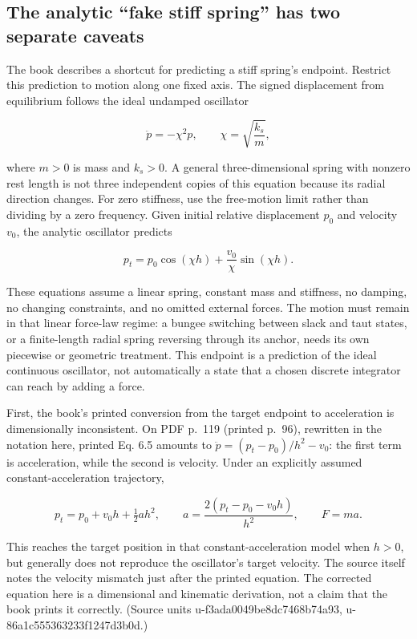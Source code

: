 \subsection{The analytic ``fake stiff spring'' has two separate caveats}\label{06-engine-ii-ch047-the-analytic-fake-stiff-spring-has-two-separate-caveats}

The book describes a shortcut for predicting a stiff spring's endpoint. Restrict this prediction to motion along one fixed axis. The signed displacement from equilibrium follows the ideal undamped oscillator

\[
\ddot p=-\chi^2p,\qquad \chi=\sqrt{\frac{k_s}{m}},
\]

where \(m>0\) is mass and \(k_s>0\). A general three-dimensional spring with nonzero rest length is not three independent copies of this equation because its radial direction changes. For zero stiffness, use the free-motion limit rather than dividing by a zero frequency. Given initial relative displacement \(p_0\) and velocity \(v_0\), the analytic oscillator predicts

\[
p_t=p_0\cos(\chi h)+\frac{v_0}{\chi}\sin(\chi h).
\]

These equations assume a linear spring, constant mass and stiffness, no damping, no changing constraints, and no omitted external forces. The motion must remain in that linear force-law regime: a bungee switching between slack and taut states, or a finite-length radial spring reversing through its anchor, needs its own piecewise or geometric treatment. This endpoint is a prediction of the ideal continuous oscillator, not automatically a state that a chosen discrete integrator can reach by adding a force.

First, the book's printed conversion from the target endpoint to acceleration is dimensionally inconsistent. On PDF p.~119 (printed p.~96), rewritten in the notation here, printed Eq. 6.5 amounts to \(\ddot p=(p_t-p_0)/h^2-v_0\): the first term is acceleration, while the second is velocity. Under an explicitly assumed constant-acceleration trajectory,

\[
p_t=p_0+v_0h+\tfrac12 ah^2,
\qquad
a=\frac{2(p_t-p_0-v_0h)}{h^2},
\qquad F=ma.
\]

This reaches the target position in that constant-acceleration model when \(h>0\), but generally does not reproduce the oscillator's target velocity. The source itself notes the velocity mismatch just after the printed equation. The corrected equation here is a dimensional and kinematic derivation, not a claim that the book prints it correctly. (Source units u-f3ada0049be8dc7468b74a93, u-86a1c555363233f1247d3b0d.)

